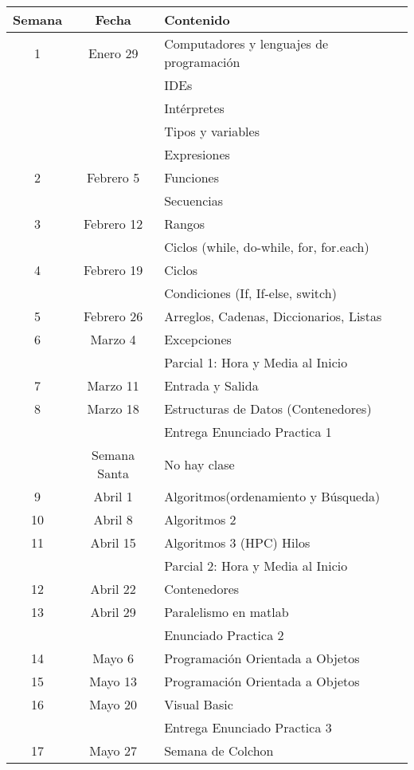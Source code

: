 \begin{tabular}{|c|c|l|}
	\hline
		Semana & Fecha & Contenido 											\\
	\hline
		 1 	& Enero 29 	& Computadores y lenguajes de programación 			\\
			& 	& IDEs 														\\
			& 	& Intérpretes 												\\
			& 	& Tipos y variables 										\\
			& 	& Expresiones 												\\ 
	\hline
		2 	& 	Febrero 5 &  Funciones 										\\
			& & Secuencias													\\
	\hline
		3   & 	Febrero 12 & Rangos 										\\
			& & Ciclos (while, do-while, for, for.each)						\\
	\hline
		4   & 	Febrero 19 & 		Ciclos 									\\
  			& &		Condiciones (If,	If-else, 	switch)		 			\\
	\hline
		5   & 	Febrero 26 & 	Arreglos, Cadenas, Diccionarios, Listas 	\\
	\hline
		6  	& Marzo 4  & Excepciones 										\\
			& & \colorbox{red!30}{Parcial 1:  Hora y Media al Inicio}		\\ 		
	\hline
		7  	& Marzo 11 & 	Entrada y Salida 								\\
	\hline
		8   & 	Marzo 18 & Estructuras de Datos (Contenedores) 				\\
			& & \colorbox{red!30}{Entrega Enunciado Practica 1}				\\
	\hline
		 	& 	Semana Santa & No hay clase 								\\
	\hline
		9   &  Abril 1 & Algoritmos(ordenamiento y Búsqueda) 				\\
	\hline
		10 	&	Abril 8 &	Algoritmos 2  									\\
	\hline
		11  & 	Abril 15   &	Algoritmos 3 (HPC) Hilos 					\\
			& & \colorbox{red!30}{Parcial 2: Hora y Media al Inicio} 		\\
	\hline
		12  & 	Abril 22 & 		Contenedores 								\\
	\hline
		13  & 	Abril 29   &		Paralelismo en matlab  					\\
			& &	\colorbox{red!30}{Enunciado Practica 2} 					\\
	\hline
		14  & 	Mayo 6  & 		Programación Orientada a 		Objetos 	\\
	\hline
		15  & 	Mayo 13 & 		Programación Orientada a Objetos 			\\
	\hline
		16  & 	Mayo 20  & 		Visual Basic	 							\\
			& & \colorbox{red!30}{Entrega Enunciado Practica 3}				\\
	\hline
		17 	& 	Mayo 27  & 		Semana de Colchon	 						\\
	\hline
	
\end{tabular}